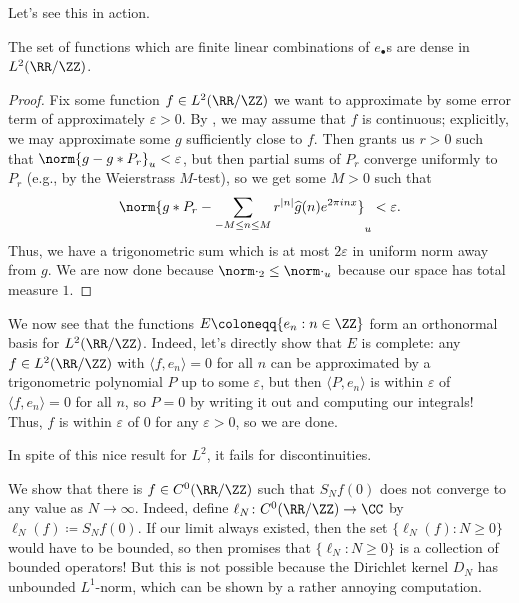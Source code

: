 \documentclass[../notes.tex]{subfiles}
\begin{document}
Let's see this in action.
\begin{proposition}
	The set of functions which are finite linear combinations of $e_\bullet$s are dense in $L^2(\RR/\ZZ)$.
\end{proposition}
\begin{proof}
	Fix some function $f\in L^2(\RR/\ZZ)$ we want to approximate by some error term of approximately $\varepsilon>0$. By , we may assume that $f$ is continuous; explicitly, we may approximate some $g$ sufficiently close to $f$. Then  grants us $r>0$ such that $\norm{g-g*P_r}_u<\varepsilon$, but then partial sums of $P_r$ converge uniformly to $P_r$ (e.g., by the Weierstrass $M$-test), so we get some $M>0$ such that
	\[\norm{g*P_r-\sum_{-M\le n\le M}r^{\left|n\right|}\widehat g(n)e^{2\pi inx}}_u<\varepsilon.\]
	Thus, we have a trigonometric sum which is at most $2\varepsilon$ in uniform norm away from $g$. We are now done because $\norm\cdot_2\le\norm\cdot_u$ because our space has total measure $1$.
\end{proof}
\begin{remark}
	We now see that the functions $E\coloneqq\{e_n:n\in\ZZ\}$ form an orthonormal basis for $L^2(\RR/\ZZ)$. Indeed, let's directly show that $E$ is complete: any $f\in L^2(\RR/\ZZ)$ with $\langle f,e_n\rangle=0$ for all $n$ can be approximated by a trigonometric polynomial $P$ up to some $\varepsilon$, but then $\langle P,e_n\rangle$ is within $\varepsilon$ of $\langle f,e_n\rangle=0$ for all $n$, so $P=0$ by writing it out and computing our integrals! Thus, $f$ is within $\varepsilon$ of $0$ for any $\varepsilon>0$, so we are done.
\end{remark}
In spite of this nice result for $L^2$, it fails for discontinuities.
\begin{example}
	We show that there is $f\in C^0(\RR/\ZZ)$ such that $S_Nf(0)$ does not converge to any value as $N\to\infty$. Indeed, define $\ell_N\colon C^0(\RR/\ZZ)\to\CC$ by $\ell_N(f)\coloneqq S_Nf(0)$. If our limit always existed, then the set $\{\ell_N(f):N\ge0\}$ would have to be bounded, so  then promises that $\{\ell_N:N\ge0\}$ is a collection of bounded operators! But this is not possible because the Dirichlet kernel $D_N$ has unbounded $L^1$-norm, which can be shown by a rather annoying computation.
\end{example}
\end{document}
